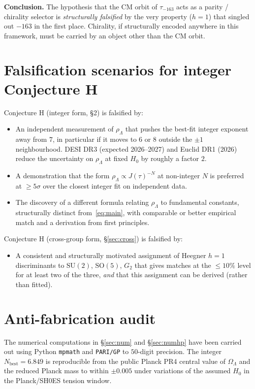 \documentclass[11pt,a4paper]{article}
\newcommand{\SU}{\mathrm{SU}}
\newcommand{\SO}{\mathrm{SO}}
\newcommand{\rhoL}{\rho_{\Lambda}}
\theoremstyle{plain}
\begin{document}
\smallskip
\noindent\textbf{Conclusion.} The hypothesis that the CM orbit of $\tau_{-163}$ acts as a parity / chirality selector is \emph{structurally falsified} by the very property ($h=1$) that singled out $-163$ in the first place. Chirality, if structurally encoded anywhere in this framework, must be carried by an object other than the CM orbit.

\section{Falsification scenarios for integer Conjecture H}\label{sec:falsif}

Conjecture H (integer form, \S2) is falsified by:
\begin{itemize}[leftmargin=2em]
  \item An independent measurement of $\rhoL$ that pushes the best-fit integer exponent away from $7$, in particular if it moves to $6$ or $8$ outside the $\pm 1$ neighbourhood. DESI DR3 (expected 2026--2027) and Euclid DR1 (2026) reduce the uncertainty on $\rhoL$ at fixed $H_{0}$ by roughly a factor $2$.
  \item A demonstration that the form $\rhoL\propto J(\tau)^{-N}$ at non-integer $N$ is preferred at $\geq 5\sigma$ over the closest integer fit on independent data.
  \item The discovery of a different formula relating $\rhoL$ to fundamental constants, structurally distinct from~\eqref{eq:main}, with comparable or better empirical match and a derivation from first principles.
\end{itemize}

Conjecture H (cross-group form, \S\ref{sec:cross}) is falsified by:
\begin{itemize}[leftmargin=2em]
  \item A consistent and structurally motivated assignment of Heegner $h=1$ discriminants to $\SU(2)$, $\SO(5)$, $G_{2}$ that gives matches at the $\leq 10\%$ level for at least two of the three, \emph{and} that this assignment can be derived (rather than fitted).
\end{itemize}

\section{Anti-fabrication audit}

The numerical computations in \S\ref{sec:num} and \S\ref{sec:numhp} have been carried out using Python \texttt{mpmath} and \texttt{PARI/GP} to $50$-digit precision. The integer $N_{\mathrm{best}}=6.849$ is reproducible from the public Planck PR4 central value of $\Omega_{\Lambda}$ and the reduced Planck mass to within $\pm 0.005$ under variations of the assumed $H_{0}$ in the Planck/SH0ES tension window.
\end{document}
